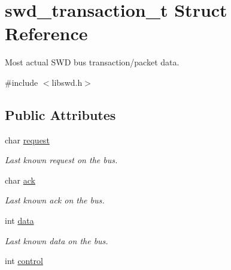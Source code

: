 \hypertarget{structswd__transaction__t}{
\section{swd\_\-transaction\_\-t Struct Reference}
\label{structswd__transaction__t}
}


Most actual SWD bus transaction/packet data.  




{\ttfamily \#include $<$libswd.h$>$}

\subsection*{Public Attributes}
\begin{DoxyCompactItemize}
\item 
\hypertarget{structswd__transaction__t_a849a80b513e3f0d7ce08a0d61889fdfd}{
char \hyperlink{structswd__transaction__t_a849a80b513e3f0d7ce08a0d61889fdfd}{request}}
\label{structswd__transaction__t_a849a80b513e3f0d7ce08a0d61889fdfd}

\begin{DoxyCompactList}\small\item\em Last known request on the bus. \item\end{DoxyCompactList}\item 
\hypertarget{structswd__transaction__t_a1668fca38e27020249a6a7ed19862ff1}{
char \hyperlink{structswd__transaction__t_a1668fca38e27020249a6a7ed19862ff1}{ack}}
\label{structswd__transaction__t_a1668fca38e27020249a6a7ed19862ff1}

\begin{DoxyCompactList}\small\item\em Last known ack on the bus. \item\end{DoxyCompactList}\item 
\hypertarget{structswd__transaction__t_a2d489d2b0435cc1afa8021516473e633}{
int \hyperlink{structswd__transaction__t_a2d489d2b0435cc1afa8021516473e633}{data}}
\label{structswd__transaction__t_a2d489d2b0435cc1afa8021516473e633}

\begin{DoxyCompactList}\small\item\em Last known data on the bus. \item\end{DoxyCompactList}\item 
\hypertarget{structswd__transaction__t_a68616ca79fc2120e89e9dd1e363f4763}{
int \hyperlink{structswd__transaction__t_a68616ca79fc2120e89e9dd1e363f4763}{control}}
\label{structswd__transaction__t_a68616ca79fc2120e89e9dd1e363f4763}


\end{DoxyCompactItemize}
